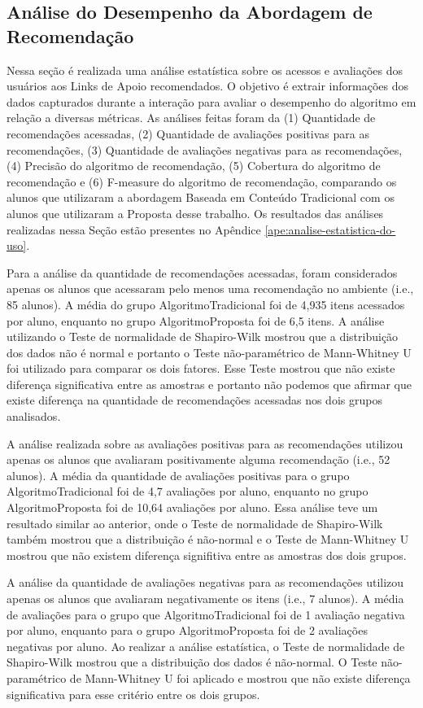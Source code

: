 \subsection{Análise do Desempenho da Abordagem de Recomendação}\label{subsection:analise-uso-sr}

Nessa seção é realizada uma análise estatística sobre os acessos e avaliações dos usuários aos Links de Apoio recomendados.
O objetivo é extrair informações dos dados capturados durante a interação para avaliar o desempenho do algoritmo em
relação a diversas métricas. As análises feitas foram da (1) Quantidade de recomendações acessadas,
(2) Quantidade de avaliações positivas para as recomendações, (3) Quantidade de avaliações negativas para as recomendações,
(4) Precisão do algoritmo de recomendação, (5) Cobertura do algoritmo de recomendação e (6) F-measure do algoritmo de
recomendação, comparando os alunos que utilizaram a abordagem Baseada em Conteúdo Tradicional com os alunos
que utilizaram a Proposta desse trabalho. Os resultados das análises realizadas nessa Seção estão presentes no Apêndice \ref{ape:analise-estatistica-do-uso}.

Para a análise da quantidade de recomendações acessadas, foram considerados apenas os alunos que acessaram pelo
menos uma recomendação no ambiente (i.e., 85 alunos). A média do grupo AlgoritmoTradicional foi de 4,935 itens
acessados por aluno, enquanto no grupo AlgoritmoProposta foi de 6,5 itens. A análise utilizando o Teste de normalidade de
Shapiro-Wilk mostrou que a distribuição dos dados não é normal e portanto o Teste não-paramétrico de Mann-Whitney U foi utilizado
para comparar os dois fatores. Esse Teste mostrou que não existe diferença significativa entre as amostras e portanto
não podemos que afirmar que existe diferença na quantidade de recomendações acessadas nos dois grupos analisados.

A análise realizada sobre as avaliações positivas para as recomendações utilizou apenas os alunos que avaliaram positivamente
alguma recomendação (i.e., 52 alunos). A média da quantidade de avaliações positivas para o grupo AlgoritmoTradicional
foi de 4,7 avaliações por aluno, enquanto no grupo AlgoritmoProposta foi de 10,64 avaliações por aluno.
Essa análise teve um resultado similar ao anterior, onde o Teste de normalidade de Shapiro-Wilk também mostrou que a
distribuição é não-normal e o Teste de Mann-Whitney U mostrou que não existem diferença signifitiva entre
as amostras dos dois grupos.

A análise da quantidade de avaliações negativas para as recomendações utilizou apenas os alunos que avaliaram negativamente
os itens (i.e., 7 alunos). A média de avaliações para o grupo que AlgoritmoTradicional foi de 1 avaliação negativa
por aluno, enquanto para o grupo AlgoritmoProposta foi de 2 avaliações negativas por aluno. Ao realizar
a análise estatística, o Teste de normalidade de Shapiro-Wilk mostrou que a distribuição dos dados é não-normal. O Teste
não-paramétrico de Mann-Whitney U foi aplicado e mostrou que não existe diferença significativa para esse critério entre
os dois grupos.

